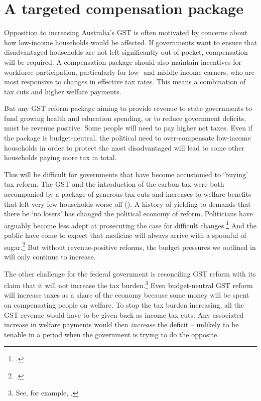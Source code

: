 \chapter{A targeted compensation package}\label{chapter:GST-3}
Opposition to increasing Australia’s GST is often motivated by concerns about how low-income households would be affected. If governments want to ensure that disadvantaged households are not left significantly out of pocket, compensation will be required. A compensation package should also maintain incentives for workforce participation, particularly for low- and middle-income earners, who are most responsive to changes in effective tax rates. This means a combination of tax cuts and higher welfare payments.  

But any GST reform package aiming to provide revenue to state governments to fund growing health and education spending,  or to reduce government deficits, must be revenue positive. Some people will need to pay higher net taxes. Even if the package is budget-neutral, the political need to over-compensate low-income households in order to protect the most disadvantaged will lead to some other households paying more tax in total.

This will be difficult for governments that have become accustomed to ‘buying’ tax reform. The GST and the introduction of the carbon tax were both accompanied by a package of generous tax cuts and increases to welfare benefits that left very few households worse off (). A history of yielding to demands that there be ‘no losers’ has changed the political economy of reform. Politicians have arguably become less adept at prosecuting the case for difficult changes.\footcite[][80]{Megalogenis2010}  And the public have come to expect that medicine will always arrive with a spoonful of sugar.\footcites[][45]{Megalogenis2010}{Henry2015}   But without revenue-positive reforms, the budget pressures we outlined in  will only continue to increase.  

The other challenge for the federal government is reconciling GST reform with its claim that it will not increase the tax burden.\footnote{See, for example, \textcite{Morrison2015-QnA-Melbourne-Institute}.}  Even budget-neutral GST reform will increase taxes as a share of the economy because some money will be spent on compensating people on welfare. To stop the tax burden increasing, all the GST revenue would have to be given back as income tax cuts. Any associated increase in welfare payments would then \emph{increase} the deficit – unlikely to be tenable in a period when the government is trying to do the opposite. 

